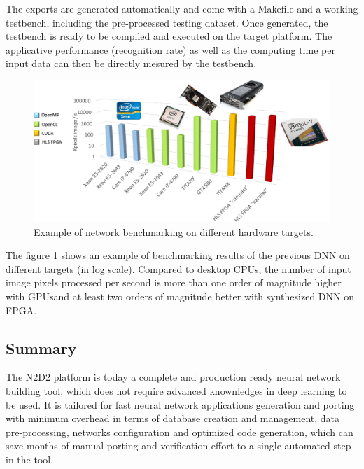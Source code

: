 \documentclass[a4paper,11pt,oneside]{article}
\newif\iffullmanual
\begin{document}
The exports are generated automatically and come with a Makefile and a working
 testbench, including the pre-processed testing dataset.
Once generated, the testbench is ready to be compiled and executed on the target
 platform. The applicative performance (recognition rate) as well as the
 computing time per input data can then be directly mesured by the testbench.

\begin{figure}[!htb]
  \centering
  \includegraphics[width=0.95\linewidth]{figs/targets_benchmarking.pdf}
  \caption{Example of network benchmarking on different hardware targets.}
  \label{fig:TargetsBenchmarking}
\end{figure}

The figure \ref{fig:TargetsBenchmarking} shows an example of benchmarking
results of the previous DNN on different targets (in log scale).
Compared to desktop CPUs, the number of input image pixels processed per second
 is more than one order of magnitude higher with GPUsand at least two orders
 of magnitude better with synthesized DNN on FPGA.

\subsection{Summary}

The N2D2 platform is today a complete and production ready neural network
building tool, which does not require advanced knownledges in deep learning to
be used. It is tailored for fast neural network applications generation and
porting with minimum overhead in terms of database creation and management,
data pre-processing, networks configuration and optimized code generation,
which can save months of manual porting and verification effort to a single
automated step in the tool.


\clearpage


\iffullmanual

\clearpage
\end{document}
